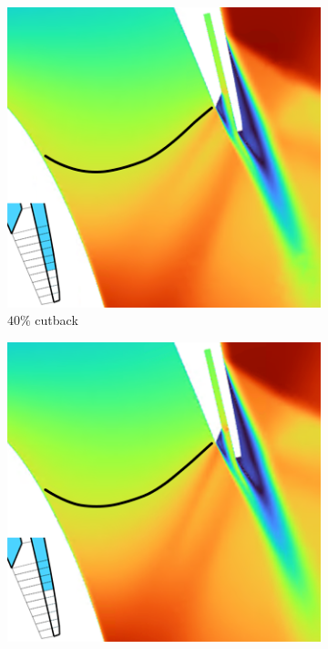 \documentclass[a4paper, 11pt, oneside]{report}
\begin{document}
\begin{figure}[H]
	\centering
	\begin{subfigure}{.45\textwidth}
		\centering
		\includegraphics[width=\linewidth]{figs/ss_cutbacks_m1_lines_4.png}
		\caption{$40\%$ cutback}
		\vspace{0.018\textheight}
	\end{subfigure}
	\hspace{0.05\textwidth}
	\begin{subfigure}{.45\textwidth}
		\centering
		\includegraphics[width=\linewidth]{figs/ss_cutbacks_m1_lines_6.png}

\end{subfigure}
\end{figure}
\end{document}
